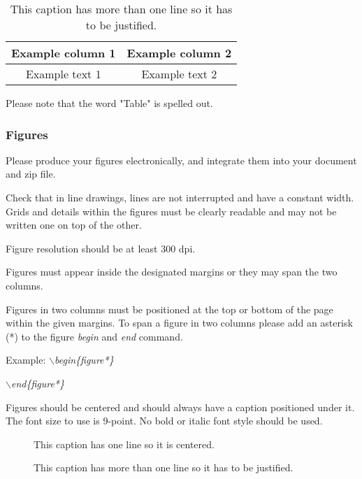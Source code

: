\documentclass[a4paper,twoside]{article}
\begin{document}
\begin{table}[h]
\caption{This caption has more than one line so it has to be
justified.}\label{tab:example2} \centering
\begin{tabular}{|c|c|}
  \hline
  Example column 1 & Example column 2 \\
  \hline
  Example text 1 & Example text 2 \\
  \hline
\end{tabular}
\end{table}

Please note that the word "Table" is spelled out.


\subsubsection{Figures}

Please produce your figures electronically, and integrate them into
your document and zip file.

Check that in line drawings, lines are not interrupted and have a
constant width. Grids and details within the figures must be clearly
readable and may not be written one on top of the other.

Figure resolution should be at least 300 dpi.

Figures must appear inside the designated margins or they may span
the two columns.

Figures in two columns must be positioned at the top or bottom of
the page within the given margins. To span a figure in two columns please add an asterisk (*) to the figure \textit{begin} and \textit{end} command.

Example: \textit{$\backslash$begin\{figure*\}}

\hspace*{1.5cm}\textit{$\backslash$end\{figure*\}}

Figures should be centered and should always have a caption
positioned under it. The font size to use is 9-point. No bold or
italic font style should be used.

\begin{figure}[!ht]
  \centering
   {}
  \caption{This caption has one line so it is centered.}
  \label{fig:example1}
 \end{figure}

\begin{figure}[!ht]
  \vspace{-0.2cm}
  \centering
   {}
  \caption{This caption has more than one line so it has to be justified.}
  \label{fig:example2}
  \vspace{-0.1cm}
\end{figure}
\end{document}
